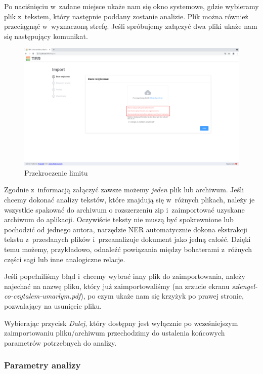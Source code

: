 \documentclass[12pt, a4paper]{article}
\begin{document}
Po naciśnięciu w~zadane miejsce ukaże nam się okno systemowe, gdzie wybieramy plik z~tekstem, który następnie poddany zostanie analizie. Plik można również przeciągnąć w~wyznaczoną strefę. Jeśli spróbujemy załączyć dwa pliki ukaże nam się następujący komunikat.

\begin{figure}[H]
  \centering
  \includegraphics[width=\linewidth]{images/import-error.png}
  \caption{Przekroczenie limitu}
\end{figure}

Zgodnie z~informacją załączyć zawsze możemy \textit{jeden} plik lub archiwum. Jeśli chcemy dokonać analizy tekstów, które znajdują się w~różnych plikach, należy je wszystkie spakować do archiwum o rozszerzeniu zip i~zaimportować uzyskane archiwum do aplikacji. Oczywiście teksty nie muszą być spokrewnione lub pochodzić od jednego autora, narzędzie NER automatycznie dokona ekstrakcji tekstu z~przesłanych plików i~przeanalizuje dokument jako jedną całość. Dzięki temu możemy, przykładowo, odnaleźć powiązania między bohaterami z~różnych części sagi lub inne analogiczne relacje.

Jeśli popełniliśmy błąd i~chcemy wybrać inny plik do zaimportowania, należy najechać na nazwę pliku, który już zaimportowaliśmy (na zrzucie ekranu \textit{szlengel-co-czytalem-umarlym.pdf}), po czym ukaże nam się krzyżyk po prawej stronie, pozwalający na usunięcie pliku.

Wybierając przycisk \textit{Dalej}, który dostępny jest wyłącznie po wcześniejszym zaimportowaniu pliku/archiwum przechodzimy do ustalenia końcowych parametrów potrzebnych do analizy.

\subsubsection{Parametry analizy}\label{parametry-analizy}
\end{document}
